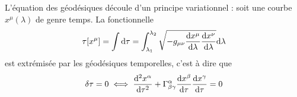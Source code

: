 \begin{theoremframe}
    \begin{propri}
    L'équation des géodésiques découle d'un principe variationnel : soit une courbe $x^{\mu}(\lambda)$ de genre temps. La fonctionnelle 
    \begin{equation}
        \tau[x^\mu] = \int \mathrm{d}\tau = \int^{\lambda_2}_{\lambda_1}\sqrt{-g_{\mu \nu}\frac{\mathrm{d} x^{\mu}}{\mathrm{d}\lambda}\frac{\mathrm{d} x^{\nu}}{\mathrm{d}\lambda}}\mathrm{d}\lambda
        \label{eq:principe variationnel géodésiques}
        \end{equation}
        est extrémisée par les géodésiques temporelles, c'est à dire que
        \begin{equation}
            \delta \tau = 0 \iff \frac{\mathrm{d} ^2 x^{\alpha}}{\mathrm{d} \tau^2} + \Gamma^{\alpha}_{\beta \gamma}\frac{\mathrm{d} x^{\beta}}{\mathrm{d} \tau}\frac{\mathrm{d} x^{\gamma}}{\mathrm{d} \tau} = 0
        \end{equation}
    \end{propri}
\end{theoremframe}

